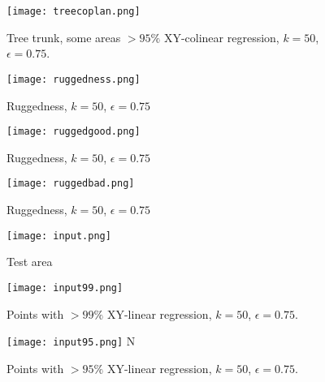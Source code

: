 \documentclass[a4paper,11pt,twoside]{article}
\theoremstyle{definition}
\theoremstyle{remark}
\begin{document}
\begin{figure}[!h]
  \caption{Tree trunk, some areas $>95\%$ XY-colinear regression, $k=50$, $\epsilon = 0.75$.}
  \centering
    \texttt{[image: treecoplan.png]}
    \label{treexy}
\end{figure}
\newpage
\newpage
\begin{figure}[!h]
  \caption{Ruggedness, $k=50$, $\epsilon = 0.75$}
  \centering
    \texttt{[image: ruggedness.png]}
    \label{ruggedness}
\end{figure}
\begin{figure}[!h]
  \caption{Ruggedness, $k=50$, $\epsilon = 0.75$}
  \centering
    \texttt{[image: ruggedgood.png]}
    \label{ruggedgood}
\end{figure}
\newpage
\begin{figure}[!h]
  \caption{Ruggedness, $k=50$, $\epsilon = 0.75$}
  \centering
    \texttt{[image: ruggedbad.png]}
    \label{ruggedbad}
\end{figure}
\begin{figure}[!h]
  \caption{Test area}
  \centering
    \texttt{[image: input.png]}
    \label{input}
\end{figure}
\newpage
\begin{figure}[!h]
  \caption{Points with $>99\%$ XY-linear regression, $k=50$, $\epsilon = 0.75$.}
  \centering
    \texttt{[image: input99.png]}
    \label{input99}
\end{figure}
\begin{figure}[!h]
  \caption{Points with $>95\%$ XY-linear regression, $k=50$, $\epsilon = 0.75$.}
  \centering
    \texttt{[image: input95.png]}
    \label{input95}N
\end{figure}
\newpage
\end{document}
